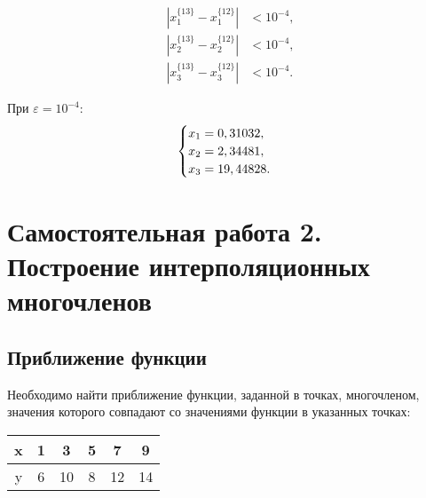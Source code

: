 \documentclass[10pt, a4paper, titlepage]{article}
\begin{document}
\begin{align*}
|x_1^{\{13\}}-x_1^{\{12\}}| &< 10^{-4}, \\
|x_2^{\{13\}}-x_2^{\{12\}}| &< 10^{-4}, \\
|x_3^{\{13\}}-x_3^{\{12\}}| &< 10^{-4}.
\end{align*}

При $\varepsilon=10^{-4}$:
\begin{equation*}
    \begin{cases}
        $$x_1=0,31032$$, \\
        $$x_2=2,34481$$, \\
        $$x_3=19,44828$$.
    \end{cases}
\end{equation*}

\newpage
\section{Самостоятельная работа \textnumero{} 2. Построение интерполяционных многочленов}

\subsection*{Приближение функции}

Необходимо найти приближение функции, заданной в точках, многочленом, значения которого совпадают со значениями функции в указанных точках:

\begin{center}
    \begin{tabular}{|c|c|c|c|c|c|}
         \hline
         x & 1 & 3 & 5 & 7 & 9 \\ \hline
         y & 6 & 10 & 8 & 12 & 14 \\
         \hline
    \end{tabular}
\end{center}
\end{document}
